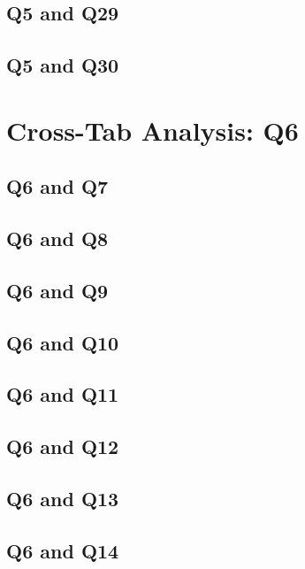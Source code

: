 \documentclass{report}
\begin{document}
\clearpage
\section{Q5 and Q29}


\clearpage
\section{Q5 and Q30}


\chapter{Cross-Tab Analysis: Q6}
\section{Q6 and Q7}


\clearpage
\section{Q6 and Q8}


\clearpage
\section{Q6 and Q9}


\clearpage
\section{Q6 and Q10}


\clearpage
\section{Q6 and Q11}


\clearpage
\section{Q6 and Q12}


\clearpage
\section{Q6 and Q13}


\clearpage
\section{Q6 and Q14}

\end{document}
